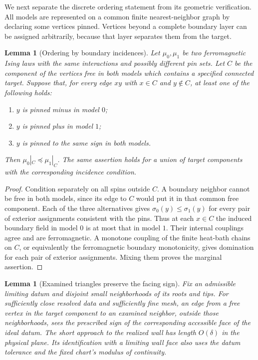 \documentclass[11pt]{article}
\newtheorem{lemma}[theorem]{Lemma}
\theoremstyle{definition}
\theoremstyle{remark}
\numberwithin{equation}{section}
\begin{document}
We next separate the discrete ordering statement from its geometric
verification.  All models are represented on a common finite
nearest-neighbor graph by declaring some vertices pinned.  Vertices
beyond a complete boundary layer can be assigned arbitrarily, because
that layer separates them from the target.

\begin{lemma}[Ordering by boundary incidences]\label{if:incidence-order}
Let $\mu_0,\mu_1$ be two ferromagnetic Ising laws with the same
interactions and possibly different pin sets.  Let $C$ be the component
of the vertices free in both models which contains a specified connected
target.  Suppose that, for every edge $xy$ with $x\in C$ and $y\notin C$,
at least one of the following holds:
\begin{enumerate}
\item $y$ is pinned minus in model $0$;
\item $y$ is pinned plus in model $1$;
\item $y$ is pinned to the same sign in both models.
\end{enumerate}
Then $\mu_0|_C\preceq\mu_1|_C$.  The same assertion holds for a union
of target components with the corresponding incidence condition.
\end{lemma}

\begin{proof}
Condition separately on all spins outside $C$.  A boundary neighbor
cannot be free in both models, since its edge to $C$ would put it in
that common free component.  Each of the three alternatives gives
$\sigma_0(y)\le\sigma_1(y)$ for every pair of exterior assignments
consistent with the pins.  Thus at each $x\in C$ the induced boundary
field in model $0$ is at most that in model $1$.  Their internal
couplings agree and are ferromagnetic.  A monotone coupling of the
finite heat-bath chains on $C$, or equivalently the ferromagnetic
boundary monotonicity, gives domination for each pair of exterior
assignments.  Mixing them proves the marginal assertion.
\end{proof}

\begin{lemma}[Examined triangles preserve the facing sign]
\label{if:triangle-incidence}
Fix an admissible limiting datum and disjoint small neighborhoods of
its roots and tips.  For sufficiently close resolved data and sufficiently
fine mesh, an edge from a free vertex in the target component to an
examined neighbor, outside those neighborhoods, sees the prescribed
sign of the corresponding accessible face of the ideal datum.
The short approach to the realized wall has length $O(\delta)$ in
the physical plane.  Its identification with a limiting wall face
also uses the datum tolerance and the fixed chart's modulus of
continuity.
\end{lemma}
\end{document}
